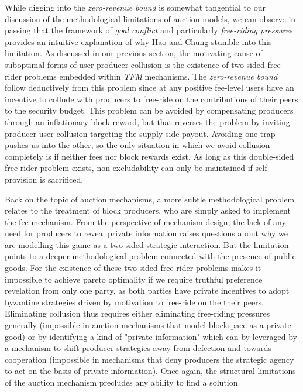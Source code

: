 While digging into the \textit{zero-revenue bound} is somewhat tangential to our discussion of the methodological limitations of auction models, we can observe in passing that the framework of \textit{goal conflict} and particularly \textit{free-riding pressures} provides an intuitive explanation of why Hao and Chung stumble into this limitation. As discussed in our previous section, the motivating cause of suboptimal forms of user-producer collusion is the existence of two-sided free-rider problems embedded within \textit{TFM} mechanisms. The \textit{zero-revenue bound} follow deductively from this problem since at any positive fee-level users have an incentive to collude with producers to free-ride on the contributions of their peers to the security budget. This problem can be avoided by compensating producers through an inflationary block reward, but that reverses the problem by inviting producer-user collusion targeting the supply-side payout. Avoiding one trap pushes us into the other, so the only situation in which we avoid collusion completely is if neither fees nor block rewards exist. As long as this double-sided free-rider problem exists, non-excludability can only be maintained if self-provision is sacrificed.

Back on the topic of auction mechanisms, a more subtle methodological problem relates to the treatment of block producers, who are simply asked to implement the fee mechanism. From the perspective of mechanism design, the lack of any need for producers to reveal private information raises questions about why we are modelling this game as a two-sided strategic interaction. But the limitation points to a deeper methodological problem connected with the presence of public goods. For the existence of these two-sided free-rider problems makes it impossible to achieve pareto optimality if we require truthful preference revelation from only one party, as both parties have private incentives to adopt byzantine strategies driven by motivation to free-ride on the their peers. Eliminating collusion thus requires either eliminating free-riding pressures generally (impossible in auction mechanisms that model blockspace as a private good) or by identifying a kind of "private information" which can by leveraged by a mechanism to shift producer strategies away from defection and towards cooperation (impossible in mechanisms that deny producers the strategic agency to act on the basis of private information). Once again, the structural limitations of the auction mechanism precludes any ability to find a solution.

